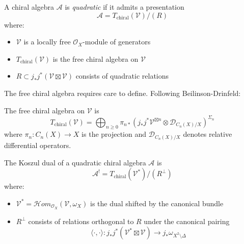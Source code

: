 \begin{definition}
A chiral algebra $\mathcal{A}$ is \emph{quadratic} if it admits a presentation
\[
\mathcal{A} = T_{\text{chiral}}(\mathcal{V})/(R)
\]
where:
\begin{itemize}
\item $\mathcal{V}$ is a locally free $\mathcal{O}_X$-module of generators
\item $T_{\text{chiral}}(\mathcal{V})$ is the free chiral algebra on $\mathcal{V}$
\item $R \subset j_*j^*(\mathcal{V} \boxtimes \mathcal{V})$ consists of quadratic relations
\end{itemize}
\end{definition}

The free chiral algebra requires care to define. Following Beilinson-Drinfeld:

\begin{definition}
The free chiral algebra on $\mathcal{V}$ is
\[
T_{\text{chiral}}(\mathcal{V}) = \bigoplus_{n \geq 0} \pi_{n*}\left(j_*j^*\mathcal{V}^{\boxtimes n} \otimes \mathcal{D}_{C_n(X)/X}\right)^{\Sigma_n}
\]
where $\pi_n: C_n(X) \to X$ is the projection and $\mathcal{D}_{C_n(X)/X}$ denotes relative differential operators.
\end{definition}

\begin{definition}
The Koszul dual of a quadratic chiral algebra $\mathcal{A}$ is
\[
\mathcal{A}^! = T_{\text{chiral}}(\mathcal{V}^*)/(R^{\perp})
\]
where:
\begin{itemize}
\item $\mathcal{V}^* = \mathcal{H}om_{\mathcal{O}_X}(\mathcal{V}, \omega_X)$ is the dual shifted by the canonical bundle
\item $R^{\perp}$ consists of relations orthogonal to $R$ under the canonical pairing
\[
\langle \cdot, \cdot \rangle: j_*j^*(\mathcal{V}^* \boxtimes \mathcal{V}) \to j_*\omega_{X^2 \setminus \Delta}
\]
\end{itemize}
\end{definition}

